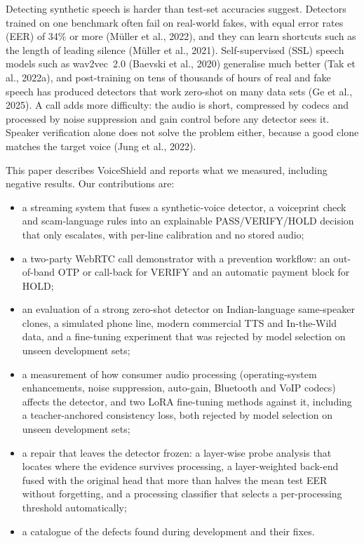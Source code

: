 \documentclass[10pt,a4paper,twocolumn]{article}
\begin{document}
Detecting synthetic speech is harder than test-set accuracies suggest. Detectors trained on one benchmark often fail on real-world fakes, with equal error rates (EER) of 34\% or more (M\"uller et al., 2022), and they can learn shortcuts such as the length of leading silence (M\"uller et al., 2021). Self-supervised (SSL) speech models such as wav2vec~2.0 (Baevski et al., 2020) generalise much better (Tak et al., 2022a), and post-training on tens of thousands of hours of real and fake speech has produced detectors that work zero-shot on many data sets (Ge et al., 2025). A call adds more difficulty: the audio is short, compressed by codecs and processed by noise suppression and gain control before any detector sees it. Speaker verification alone does not solve the problem either, because a good clone matches the target voice (Jung et al., 2022).

This paper describes VoiceShield and reports what we measured, including negative results. Our contributions are:
\begin{itemize}\setlength\itemsep{0pt}
  \item a streaming system that fuses a synthetic-voice detector, a voiceprint check and scam-language rules into an explainable PASS/VERIFY/HOLD decision that only escalates, with per-line calibration and no stored audio;
  \item a two-party WebRTC call demonstrator with a prevention workflow: an out-of-band OTP or call-back for VERIFY and an automatic payment block for HOLD;
  \item an evaluation of a strong zero-shot detector on Indian-language same-speaker clones, a simulated phone line, modern commercial TTS and In-the-Wild data, and a fine-tuning experiment that was rejected by model selection on unseen development sets;
  \item a measurement of how consumer audio processing (operating-system enhancements, noise suppression, auto-gain, Bluetooth and VoIP codecs) affects the detector, and two LoRA fine-tuning methods against it, including a teacher-anchored consistency loss, both rejected by model selection on unseen development sets;
  \item a repair that leaves the detector frozen: a layer-wise probe analysis that locates where the evidence survives processing, a layer-weighted back-end fused with the original head that more than halves the mean test EER without forgetting, and a processing classifier that selects a per-processing threshold automatically;
  \item a catalogue of the defects found during development and their fixes.
\end{itemize}
\end{document}
